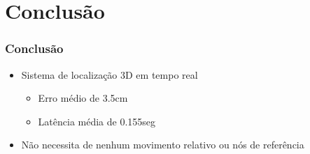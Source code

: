 \section{Conclusão}

\begin{frame}
  \frametitle{Conclusão}

        \begin{itemize}
    \item Sistema de localização 3D em tempo real
                \begin{itemize}
      \item Erro médio de 3.5cm
                        \item Latência média de 0.155seg
                \end{itemize}
                \item Não necessita de nenhum movimento relativo ou nós de referência
        \end{itemize}
\end{frame}
